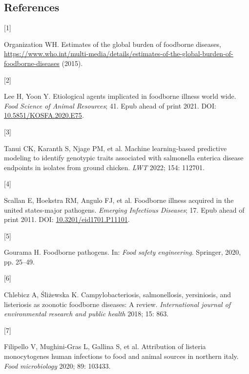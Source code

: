\documentclass[
  10pt,
]{article}
\newlength{\cslhangindent}
\newlength{\csllabelwidth}
\newlength{\cslentryspacingunit} %
\newenvironment{CSLReferences}[2] %
 {%
  \setlength{\parindent}{0pt}
  \ifodd #1
  \let\oldpar\par
  \def\par{\hangindent=\cslhangindent\oldpar}
  \fi
  \setlength{\parskip}{#2\cslentryspacingunit}
 }%
 {}
\newcommand{\CSLLeftMargin}[1]{\parbox[t]{\csllabelwidth}{#1}}
\newcommand{\CSLRightInline}[1]{\parbox[t]{\linewidth - \csllabelwidth}{#1}\break}
\begin{document}
\newpage

\hypertarget{references}{%
\subsection{References}\label{references}}

\hypertarget{refs}{}
\begin{CSLReferences}{0}{0}
\leavevmode{}%
\CSLLeftMargin{{[}1{]} }%
\CSLRightInline{Organization WH. Estimates of the global burden of foodborne diseases, \url{https://www.who.int/multi-media/details/estimates-of-the-global-burden-of-foodborne-diseases} (2015).}

\leavevmode{}%
\CSLLeftMargin{{[}2{]} }%
\CSLRightInline{Lee H, Yoon Y. Etiological agents implicated in foodborne illness world wide. \emph{Food Science of Animal Resources}; 41. Epub ahead of print 2021. DOI: \href{https://doi.org/10.5851/KOSFA.2020.E75}{10.5851/KOSFA.2020.E75}.}

\leavevmode{}%
\CSLLeftMargin{{[}3{]} }%
\CSLRightInline{Tanui CK, Karanth S, Njage PM, et al. Machine learning-based predictive modeling to identify genotypic traits associated with salmonella enterica disease endpoints in isolates from ground chicken. \emph{LWT} 2022; 154: 112701.}

\leavevmode{}%
\CSLLeftMargin{{[}4{]} }%
\CSLRightInline{Scallan E, Hoekstra RM, Angulo FJ, et al. Foodborne illness acquired in the united states-major pathogens. \emph{Emerging Infectious Diseases}; 17. Epub ahead of print 2011. DOI: \href{https://doi.org/10.3201/eid1701.P11101}{10.3201/eid1701.P11101}.}

\leavevmode{}%
\CSLLeftMargin{{[}5{]} }%
\CSLRightInline{Gourama H. Foodborne pathogens. In: \emph{Food safety engineering}. Springer, 2020, pp. 25--49.}

\leavevmode{}%
\CSLLeftMargin{{[}6{]} }%
\CSLRightInline{Chlebicz A, Śliżewska K. Campylobacteriosis, salmonellosis, yersiniosis, and listeriosis as zoonotic foodborne diseases: A review. \emph{International journal of environmental research and public health} 2018; 15: 863.}

\leavevmode{}%
\CSLLeftMargin{{[}7{]} }%
\CSLRightInline{Filipello V, Mughini-Gras L, Gallina S, et al. Attribution of listeria monocytogenes human infections to food and animal sources in northern italy. \emph{Food microbiology} 2020; 89: 103433.}


\end{CSLReferences}
\end{document}
